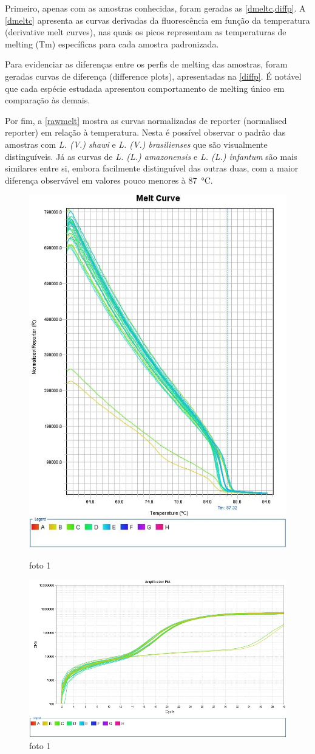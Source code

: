 Primeiro, apenas com as amostras conhecidas, foram geradas as
\cref{dmeltc,diffp}. A
\cref{dmeltc} apresenta as curvas derivadas da fluorescência em função da
temperatura (derivative melt curves), nas quais os picos representam as
temperaturas de melting (Tm) específicas para cada amostra padronizada.

Para evidenciar as diferenças entre os perfis de melting das
amostras, foram geradas curvas de diferença (difference plots), apresentadas na
\cref{diffp}. 
É notável que cada espécie estudada
apresentou comportamento de melting único em comparação às demais. 

Por fim, a \cref{rawmelt} mostra as curvas normalizadas de reporter (normalised
reporter) em relação à
temperatura. Nesta é possível observar o padrão das amostras com \textit{L. (V.) shawi} e
\textit{L. (V.) brasilienses} que são visualmente distinguíveis. Já as curvas de
\textit{L. (L.) amazonensis} e \textit{L. (L.) infantum} são mais similares
entre si, embora facilmente distinguível das outras duas,  com
a maior diferença observável em valores pouco menores à \qty{87}{\celsius}.

\begin{figure}
        \centering
        \includegraphics[width=.4\textwidth]{fig/Melt Curve.jpg}
        \caption{foto 1}
        \label{meltc}
        \includegraphics[width=.4\textwidth]{fig/Amplification Plot.jpg}
        \caption{foto 1}
        \label{amplip}
\end{figure}

